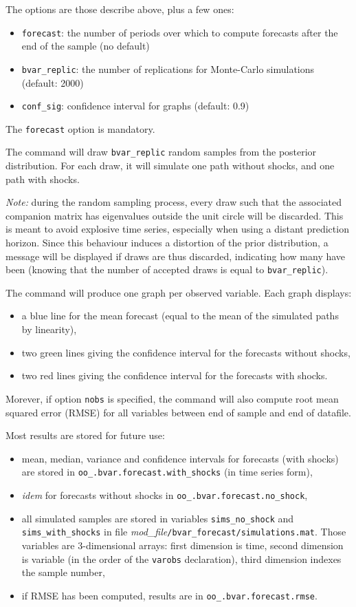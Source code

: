 \documentclass[10pt,a4paper]{article}
\begin{document}
The options are those describe above, plus a few ones:
\begin{itemize}
\item \texttt{forecast}: the number of periods over which to compute forecasts after the end of the sample (no default)
\item \texttt{bvar\_replic}: the number of replications for Monte-Carlo simulations (default: 2000)
\item \texttt{conf\_sig}: confidence interval for graphs (default: 0.9)
\end{itemize}

The \texttt{forecast} option is mandatory.

The command will draw \texttt{bvar\_replic} random samples from the posterior distribution. For each draw, it will simulate one path without shocks, and one path with shocks.

\emph{Note:} during the random sampling process, every draw such that the associated companion matrix has eigenvalues outside the unit circle will be discarded. This is meant to avoid explosive time series, especially when using a distant prediction horizon. Since this behaviour induces a distortion of the prior distribution, a message will be displayed if draws are thus discarded, indicating how many have been (knowing that the number of accepted draws is equal to \texttt{bvar\_replic}).

The command will produce one graph per observed variable. Each graph displays:
\begin{itemize}
\item a blue line for the mean forecast (equal to the mean of the simulated paths by linearity),
\item two green lines giving the confidence interval for the forecasts without shocks,
\item two red lines giving the confidence interval for the forecasts with shocks.
\end{itemize}

Morever, if option \texttt{nobs} is specified, the command will also compute root mean squared error (RMSE) for all variables between end of sample and end of datafile.

Most results are stored for future use:
\begin{itemize}
\item mean, median, variance and confidence intervals for forecasts (with shocks) are stored in \texttt{oo\_.bvar.forecast.with\_shocks} (in time series form),
\item \textit{idem} for forecasts without shocks in \texttt{oo\_.bvar.forecast.no\_shock},
\item all simulated samples are stored in variables \texttt{sims\_no\_shock} and \texttt{sims\_with\_shocks} in file \textit{mod\_file}\texttt{/bvar\_forecast/simulations.mat}. Those variables are 3-dimensional arrays: first dimension is time, second dimension is variable (in the order of the \texttt{varobs} declaration), third dimension indexes the sample number,
\item if RMSE has been computed, results are in \texttt{oo\_.bvar.forecast.rmse}.
\end{itemize}
\end{document}
